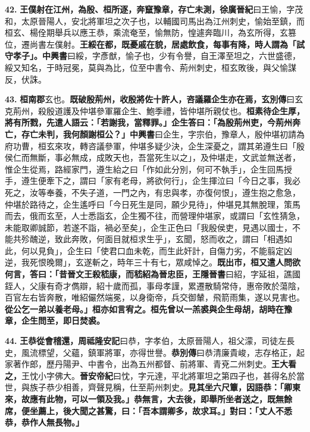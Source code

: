 \textbf{42.} \textbf{王僕射在江州，為殷、桓所逐，奔竄豫章，存亡未測，}{\footnotesize \textbf{徐廣晉紀}曰王愉，字茂和，太原晉陽人，安北將軍坦之次子也，以輔國司馬出為江州刺史，愉始至鎮，而桓玄、楊佺期舉兵以應王恭，乘流奄至，愉無防，惶遽奔臨川，為玄所得，玄篡位，遷尚書左僕射。}\textbf{王綏在都，既憂戚在貌，居處飲食，每事有降，時人謂為「試守孝子」。}{\footnotesize \textbf{中興書}曰綏，字彥猷，愉子也，少有令譽，自王澤至坦之，六世盛德，綏又知名，于時冠冕，莫與為比，位至中書令、荊州刺史，桓玄敗後，與父愉謀反，伏誅。}

\textbf{43.} \textbf{桓南郡}{\footnotesize 玄也。}\textbf{既破殷荊州，收殷將佐十許人，咨議羅企生亦在焉，}{\footnotesize \textbf{玄別傳}曰玄克荊州，殺殷道護及仲堪參軍羅企生、鮑季禮，皆仲堪所親仗也。}\textbf{桓素待企生厚，將有所戮，先遣人語云：「若謝我，當釋罪。」企生答曰：「為殷荊州吏，今荊州奔亡，存亡未判，我何顏謝桓公？」}{\footnotesize \textbf{中興書}曰企生，字宗伯，豫章人，殷仲堪初請為府功曹，桓玄來攻，轉咨議參軍，仲堪多疑少決，企生深憂之，謂其弟遵生曰「殷侯仁而無斷，事必無成，成敗天也，吾當死生以之」，及仲堪走，文武並無送者，惟企生從焉，路經家門，遵生紿之曰「作如此分別，何可不執手」，企生回馬授手，遵生便牽下之，謂曰「家有老母，將欲何行」，企生揮泣曰「今日之事，我必死之，汝等奉養，不失子道，一門之內，有忠與孝，亦復何恨」，遵生抱之愈急，仲堪於路待之，企生遙呼曰「今日死生是同，願少見待」，仲堪見其無脫理，策馬而去，俄而玄至，人士悉詣玄，企生獨不往，而營理仲堪家，或謂曰「玄性猜急，未能取卿誠節，若遂不詣，禍必至矣」，企生正色曰「我殷侯吏，見遇以國士，不能共殄醜逆，致此奔敗，何面目就桓求生乎」，玄聞，怒而收之，謂曰「相遇如此，何以見負」，企生曰「使君口血未乾，而生此奸計，自傷力劣，不能翦定凶逆，我死恨晚爾」，玄遂斬之，時年三十有七，眾咸悼之。}\textbf{既出市，桓又遣人問欲何言，答曰：「昔晉文王殺嵇康，而嵇紹為晉忠臣，}{\footnotesize \textbf{王隱晉書}曰紹，字延祖，譙國銍人，父康有奇才儁辯，紹十歲而孤，事母孝謹，累遷散騎常侍，惠帝敗於蕩陰，百官左右皆奔散，唯紹儼然端冕，以身衛帝，兵交御輦，飛箭雨集，遂以見害也。}\textbf{從公乞一弟以養老母。」桓亦如言宥之。桓先曾以一羔裘與企生母胡，胡時在豫章，企生問至，即日焚裘。}

\textbf{44.} \textbf{王恭從會稽還，}{\footnotesize \textbf{周祗隆安記}曰恭，字孝伯，太原晉陽人，祖父濛，司徒左長史，風流標望，父蘊，鎮軍將軍，亦得世譽。\textbf{恭別傳}曰恭清廉貴峻，志存格正，起家著作郎，歷丹陽尹、中書令，出為五州都督、前將軍、青兗二州刺史。}\textbf{王大看之，}{\footnotesize 王忱小字佛大。\textbf{晉安帝紀}曰忱，字元達，平北將軍坦之第四子也，甚得名於當世，與族子恭少相善，齊聲見稱，仕至荊州刺史。}\textbf{見其坐六尺簟，因語恭：「卿東來，故應有此物，可以一領及我。」恭無言，大去後，即舉所坐者送之，既無餘席，便坐薦上，後大聞之甚驚，曰：「吾本謂卿多，故求耳。」對曰：「丈人不悉恭，恭作人無長物。」}

